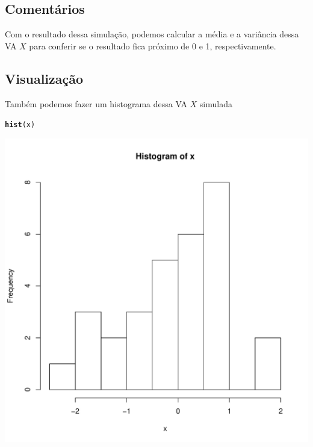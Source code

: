 \documentclass{article}\usepackage[]{graphicx}\usepackage[]{color}
\makeatletter
\def\maxwidth{ %
  \ifdim\Gin@nat@width>\linewidth
    \linewidth
  \else
    \Gin@nat@width
  \fi
}
\newcommand{\hlstd}[1]{\textcolor[rgb]{0.345,0.345,0.345}{#1}}%
\newcommand{\hlkwd}[1]{\textcolor[rgb]{0.737,0.353,0.396}{\textbf{#1}}}%
\newenvironment{kframe}{%
 \def\at@end@of@kframe{}%
 \ifinner\ifhmode%
  \def\at@end@of@kframe{\end{minipage}}%
  \begin{minipage}{\columnwidth}%
 \fi\fi%
 \def\FrameCommand##1{\hskip\@totalleftmargin \hskip-\fboxsep
 \colorbox{shadecolor}{##1}\hskip-\fboxsep
     \hskip-\linewidth \hskip-\@totalleftmargin \hskip\columnwidth}%
 \MakeFramed {\advance\hsize-\width
   \@totalleftmargin\z@ \linewidth\hsize
   \@setminipage}}%
 {\par\unskip\endMakeFramed%
 \at@end@of@kframe}
\newenvironment{knitrout}{}{} %
\makeatother
\begin{document}
\subsection{Comentários}

Com o resultado dessa simulação, podemos calcular a média e a variância
dessa VA $X$ para conferir se o resultado fica próximo de 0 e 1,
respectivamente.

\subsection{Visualização}

Também podemos fazer um histograma dessa VA $X$ simulada

\begin{knitrout}
\color{fgcolor}\begin{kframe}
\begin{alltt}
\hlkwd{hist}\hlstd{(x)}
\end{alltt}
\end{kframe}
\includegraphics[width=\maxwidth]{figure/unnamed-chunk-2-1} 

\end{knitrout}
\end{document}
